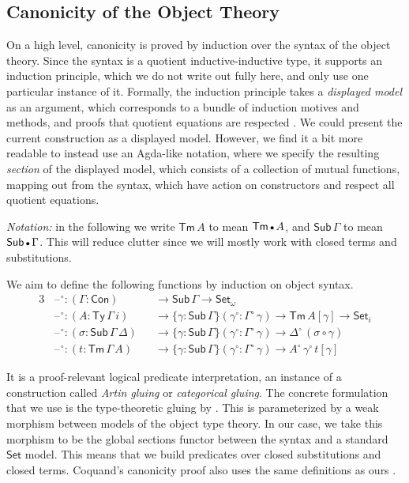 \documentclass[acmsmall,screen,review,anonymous]{acmart}
\newcommand{\msf}[1]{{\mathsf{#1}}}
\newcommand{\Set}{\msf{Set}}
\newcommand{\blank}{{\mathord{\hspace{1pt}\text{--}\hspace{1pt}}}}
\newcommand{\emptycon}{\scaleobj{.75}\bullet}
\newcommand{\Con}{\msf{Con}}
\newcommand{\Sub}{\msf{Sub}}
\newcommand{\Ty}{\msf{Ty}}
\newcommand{\Tm}{\msf{Tm}}
\newcommand{\w}{\circ}
\begin{document}
\subsection{Canonicity of the Object Theory}\label{sec:canonicity-model}

On a high level, canonicity is proved by induction over the syntax of the object theory. Since the
syntax is a quotient inductive-inductive type, it supports an induction principle, which we do not
write out fully here, and only use one particular instance of it. Formally, the induction principle
takes a \emph{displayed model} as an argument, which corresponds to a bundle of induction motives
and methods, and proofs that quotient equations are respected
\cite[Chapter~4]{DBLP:journals/corr/abs-2302-08837}. We could present the current construction as a
displayed model. However, we find it a bit more readable to instead use an Agda-like notation, where
we specify the resulting \emph{section} of the displayed model, which consists of a collection of
mutual functions, mapping out from the syntax, which have action on constructors and respect all
quotient equations.

\emph{Notation:} in the following we write $\Tm\,A$ to mean $\Tm\,\emptycon\,A$, and
$\Sub\,\Gamma$ to mean $\Sub\,\emptycon\,\Gamma$. This will reduce clutter since we will mostly work
with closed terms and substitutions.

We aim to define the following functions by induction on object syntax.
\begin{alignat*}{3}
  &\blank^\w : (\Gamma : \Con)      && \to \Sub\,\Gamma \to \Set_\omega\\
  &\blank^\w : (A : \Ty\,\Gamma\,i) && \to \{\gamma : \Sub\,\Gamma\}(\gamma^\w : \Gamma^\w\,\gamma) \to \Tm\,A[\gamma] \to \Set_i\\
  &\blank^\w : (\sigma : \Sub\,\Gamma\,\Delta) && \to \{\gamma : \Sub\,\Gamma\}(\gamma^\w : \Gamma^\w\,\gamma) \to \Delta^\w\,(\sigma \circ \gamma)\\
  &\blank^\w : (t : \Tm\,\Gamma\,A) && \to \{\gamma : \Sub\,\Gamma\}(\gamma^\w : \Gamma^\w\,\gamma) \to A^\w\,\gamma^\w\,t[\gamma]
\end{alignat*}

It is a proof-relevant logical predicate interpretation, an instance of a construction called
\emph{Artin gluing} \cite[Exposé~4,~Section~9.5]{SGA4} or \emph{categorical gluing}. The concrete
formulation that we use is the type-theoretic gluing by \citet{gluing}. This is parameterized by a
weak morphism between models of the object type theory. In our case, we take this morphism to be the
global sections functor between the syntax and a standard $\Set$ model. This means that we build
predicates over closed substitutions and closed terms. Coquand's canonicity proof also uses the same
definitions as ours \cite{coquand2018canonicity}.
\end{document}
